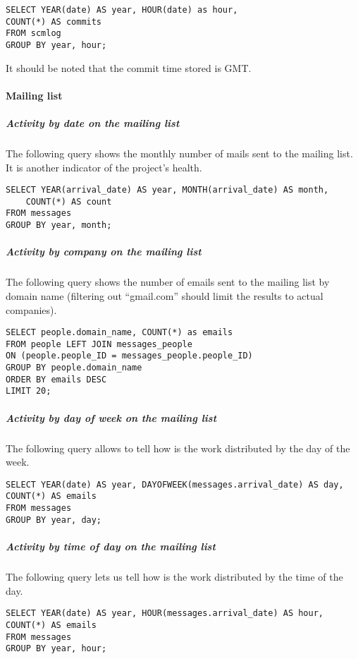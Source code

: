 \begin{verbatim}
SELECT YEAR(date) AS year, HOUR(date) as hour, 
COUNT(*) AS commits
FROM scmlog 
GROUP BY year, hour;
\end{verbatim}

It should be noted that the commit time stored is GMT. 

\paragraph{Mailing list}

\subparagraph{Activity by date on the mailing list}

The following query shows the monthly number of mails sent to the mailing list. It is another indicator of the project's health.

\begin{verbatim}
SELECT YEAR(arrival_date) AS year, MONTH(arrival_date) AS month, 
	COUNT(*) AS count
FROM messages
GROUP BY year, month;
\end{verbatim}

\subparagraph{Activity by company on the mailing list}

The following query shows the number of emails sent to the mailing list by domain name (filtering out ``gmail.com'' should limit the results to actual companies).

\begin{verbatim}
SELECT people.domain_name, COUNT(*) as emails
FROM people LEFT JOIN messages_people 
ON (people.people_ID = messages_people.people_ID) 
GROUP BY people.domain_name 
ORDER BY emails DESC 
LIMIT 20;
\end{verbatim}

\subparagraph{Activity by day of week on the mailing list}

The following query allows to tell how is the work distributed by the day of the week.

\begin{verbatim}
SELECT YEAR(date) AS year, DAYOFWEEK(messages.arrival_date) AS day, 
COUNT(*) AS emails 
FROM messages
GROUP BY year, day;
\end{verbatim}

\subparagraph{Activity by time of day on the mailing list}

The following query lets us tell how is the work distributed by the time of the day.

\begin{verbatim}
SELECT YEAR(date) AS year, HOUR(messages.arrival_date) AS hour, 
COUNT(*) AS emails 
FROM messages 
GROUP BY year, hour;
\end{verbatim}


